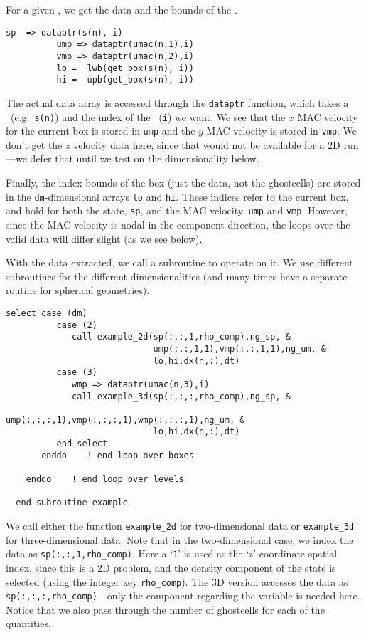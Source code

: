 For a given \boxtype, we get the data and the bounds of the \boxtype.
\begin{lstlisting}[language={[95]fortran},mathescape=false]
          sp  => dataptr(s(n), i)
          ump => dataptr(umac(n,1),i)
          vmp => dataptr(umac(n,2),i)
          lo =  lwb(get_box(s(n), i))
          hi =  upb(get_box(s(n), i))
\end{lstlisting}


The actual data array is accessed through the {\tt dataptr} function,
which takes a \multifab\ (e.g.\ {\tt s(n)}) and the index of the
\boxtype\ ({\tt i}) we want.  We see that the $x$ MAC velocity for the
current box is stored in {\tt ump} and the $y$ MAC velocity is stored
in {\tt vmp}.  We don't get the $z$ velocity data here, since that
would not be available for a 2D run---we defer that until we test on
the dimensionality below.

Finally, the index bounds of the box (just the data, not the ghostcells) are 
stored in the {\tt dm}-dimensional arrays {\tt lo} and {\tt hi}.  These indices
refer to the current box, and hold for both the state, {\tt sp}, and the MAC
velocity, {\tt ump} and {\tt vmp}.  However, since the MAC velocity is nodal
in the component direction, the loops over the valid data will differ
slight (as we see below).

With the data extracted, we call a subroutine to operate on it.  We use
different subroutines for the different dimensionalities (and many times
have a separate routine for spherical geometries).
\begin{lstlisting}[language={[95]fortran},mathescape=false]
          select case (dm)
          case (2)
             call example_2d(sp(:,:,1,rho_comp),ng_sp, &
                             ump(:,:,1,1),vmp(:,:,1,1),ng_um, &
                             lo,hi,dx(n,:),dt)
          case (3)
             wmp => dataptr(umac(n,3),i)
             call example_3d(sp(:,:,:,rho_comp),ng_sp, &
                             ump(:,:,:,1),vmp(:,:,:,1),wmp(:,:,:,1),ng_um, &
                             lo,hi,dx(n,:),dt)
          end select
       enddo    ! end loop over boxes

    enddo    ! end loop over levels

  end subroutine example
\end{lstlisting}
\noindent We call either the function
{\tt example\_2d} for two-dimensional data or {\tt example\_3d}
for three-dimensional data.  Note that in the two-dimensional
case, we index the data as {\tt sp(:,:,1,rho\_comp)}.  Here a
`{\tt 1}' is used as the `z'-coordinate spatial index, since this
is a 2D problem, and the density component of the state is selected
(using the integer key {\tt rho\_comp}).  The 3D version accesses
the data as {\tt sp(:,:,:,rho\_comp)}---only the component regarding
the variable is needed here.  Notice that we also pass through
the number of ghostcells for each of the quantities.

